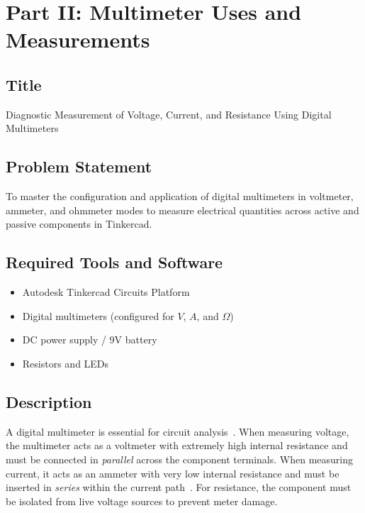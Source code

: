 \documentclass[11pt,a4paper]{article}
\begin{document}
\section{Part II: Multimeter Uses and Measurements}

\subsection{Title}
Diagnostic Measurement of Voltage, Current, and Resistance Using Digital Multimeters

\subsection{Problem Statement}
To master the configuration and application of digital multimeters in voltmeter, ammeter, and ohmmeter modes to measure electrical quantities across active and passive components in Tinkercad.

\subsection{Required Tools and Software}
\begin{itemize}
    \item Autodesk Tinkercad Circuits Platform~\cite{ref_tinkercad}
    \item Digital multimeters (configured for $V$, $A$, and $\Omega$)
    \item DC power supply / 9V battery
    \item Resistors and LEDs
\end{itemize}

\subsection{Description}
A digital multimeter is essential for circuit analysis~\cite{ref_boylestad}. When measuring voltage, the multimeter acts as a voltmeter with extremely high internal resistance and must be connected in \emph{parallel} across the component terminals. When measuring current, it acts as an ammeter with very low internal resistance and must be inserted in \emph{series} within the current path~\cite{ref_boylestad}. For resistance, the component must be isolated from live voltage sources to prevent meter damage.
\end{document}
